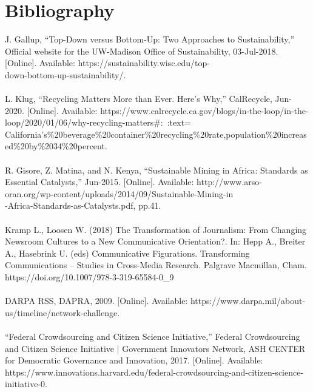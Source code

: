 \documentclass{ucsdreport}
\begin{document}
\newpage

\section{Bibliography}
J. Gallup, “Top-Down versus Bottom-Up: Two Approaches to Sustainability,” Official website for the UW-Madison Office of Sustainability, 03-Jul-2018. [Online]. Available: https://sustainability.wisc.edu/top-\\
down-bottom-up-sustainability/. 
\\
\\
L. Klug, “Recycling Matters More than Ever. Here's Why,” CalRecycle, Jun-2020. [Online]. Available: https://www.calrecycle.ca.gov/blogs/in-the-loop/in-the-loop/2020/01/06/why-recycling-matters\#:~:text=\\
California's\%20beverage\%20container\%20recycling\%20rate,population\%20increased\%20by\%2034\%20percent.
\\
\\
R. Gisore, Z. Matina, and N. Kenya, “Sustainable Mining in Africa: Standards as Essential Catalysts,” Jun-2015. [Online]. Available: http://www.arso-oran.org/wp-content/uploads/2014/09/Sustainable-Mining-in\\
-Africa-Standards-as-Catalysts.pdf, pp.41. 
\\
\\
Kramp L., Loosen W. (2018) The Transformation of Journalism: From Changing Newsroom Cultures to a New Communicative Orientation?. In: Hepp A., Breiter A., Hasebrink U. (eds) Communicative Figurations. Transforming Communications – Studies in Cross-Media Research. Palgrave Macmillan, Cham. https://doi.org/10.1007/978-3-319-65584-0\_9
\\
\\
DARPA RSS, DAPRA, 2009. [Online]. Available: 
https://www.darpa.mil/about-us/timeline/network-challenge.
\\
\\
“Federal Crowdsourcing and Citizen Science Initiative,” Federal Crowdsourcing and
Citizen Science Initiative | Government Innovators Network, ASH CENTER for
Democratic Governance and Innovation, 2017. [Online]. Available: https://www.innovations.harvard.edu/federal-crowdsourcing-and-citizen-science-initiative-0.
\\
\end{document}
